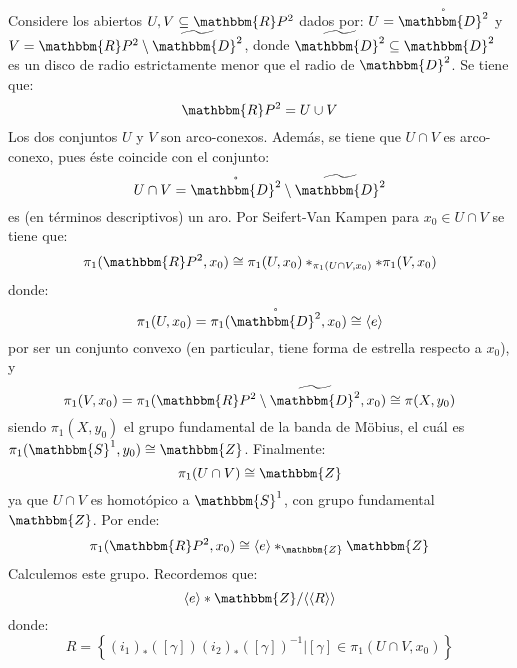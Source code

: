 \documentclass[12pt]{report}
\theoremstyle{largebreak}
\newcommand{\bbm}[1]{\ensuremath{\mathbbm{#1}}}
\newcommand{\gen}[1]{\ensuremath{\langle#1\rangle}}
\begin{document}
\begin{sol}
        Considere los abiertos $U,V\subseteq\bbm{R}P^2$ dados por: $U=\mathring{\bbm{D}^2}$ y $V=\bbm{R}P^2\setminus\widetilde{\bbm{D}^2}$, donde $\widetilde{\bbm{D}^2}\subseteq\bbm{D}^2$ es un disco de radio estrictamente menor que el radio de $\bbm{D}^2$. Se tiene que:
        \begin{equation*}
            \bbm{R}P^2=U\cup V
        \end{equation*}
        Los dos conjuntos $U$ y $V$ son arco-conexos. Además, se tiene que $U\cap V$ es arco-conexo, pues éste coincide con el conjunto:
        \begin{equation*}
            U\cap V=\mathring{\bbm{D}^2}\setminus\widetilde{\bbm{D}^2}
        \end{equation*}
        es (en términos descriptivos) un aro. Por Seifert-Van Kampen para $x_0\in U\cap V$ se tiene que:
        \begin{equation*}
            \pi_1(\bbm{R}P^2,x_0)\cong\pi_1(U,x_0)*_{\pi_1(U\cap V,x_0)}*\pi_1(V,x_0)
        \end{equation*}
        donde:
        \begin{equation*}
            \pi_1(U,x_0)=\pi_1(\mathring{\bbm{D}^2},x_0)\cong\gen{e}
        \end{equation*}
        por ser un conjunto convexo (en particular, tiene forma de estrella respecto a $x_0$), y
        \begin{equation*}
            \pi_1(V,x_0)=\pi_1(\bbm{R}P^2\setminus\widetilde{\bbm{D}^2},x_0)\cong\pi(X,y_0)
        \end{equation*}
        siendo $\pi_1(X,y_0)$ el grupo fundamental de la banda de Möbius, el cuál es $\pi_1(\bbm{S}^1,y_0)\cong\bbm{Z}$. Finalmente:
        \begin{equation*}
            \pi_1(U\cap V)\cong\bbm{Z}
        \end{equation*}
        ya que $U\cap V$ es homotópico a $\bbm{S}^1$, con grupo fundamental $\bbm{Z}$. Por ende:
        \begin{equation*}
            \pi_1(\bbm{R}P^2,x_0)\cong\gen{e}*_{\bbm{Z}}\bbm{Z}
        \end{equation*}
        Calculemos este grupo. Recordemos que:
        \begin{equation*}
            \gen{e}*\bbm{Z}/\gen{\gen{R}}
        \end{equation*}
        donde:
        \begin{equation*}
            R=\left\{(i_1)_*([\gamma])(i_2)_*([\gamma])^{-1}\Big|[\gamma]\in\pi_1(U\cap V,x_0) \right\}

\end{equation*}
\end{sol}
\end{document}
